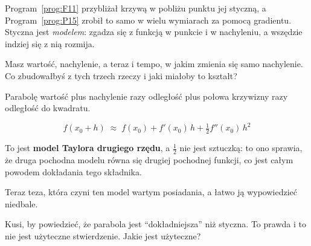 \begin{fr}
Program~\ref{prog:F11} przybliżał krzywą w pobliżu punktu jej styczną, a
Program~\ref{prog:P15} zrobił to samo w wielu wymiarach za pomocą gradientu.
Styczna jest \emph{modelem}: zgadza się z funkcją w punkcie i w nachyleniu, a
wszędzie indziej się z nią rozmija.

Masz wartość, nachylenie, a teraz i tempo, w jakim zmienia się samo
nachylenie. Co zbudowałbyś z tych trzech rzeczy i jaki miałoby to kształt?
\dotline
\nextframe
\end{fr}

\begin{fr}
\begin{ansblock}
Parabolę \dash{} wartość plus nachylenie razy odległość plus połowa
krzywizny razy odległość do kwadratu.
\end{ansblock}

\[ f(x_0 + h) \;\approx\; f(x_0) + f'(x_0)\,h + \tfrac{1}{2}f''(x_0)\,h^{2} \]

To jest \textbf{model Taylora drugiego rzędu}, a $\tfrac{1}{2}$ nie jest
sztuczką: to ono sprawia, że druga pochodna modelu równa się drugiej pochodnej
funkcji, co jest całym powodem dokładania tego składnika.

\end{fr}

\begin{fr}
Teraz teza, która czyni ten model wartym posiadania, a łatwo ją wypowiedzieć
niedbale.

Kusi, by powiedzieć, że parabola jest \enquote{dokładniejsza} niż styczna. To
prawda i to nie jest użyteczne stwierdzenie. Jakie jest użyteczne?
\nextframe
\end{fr}


